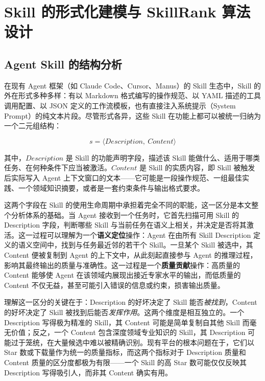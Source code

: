 
\chapter{Skill 的形式化建模与 SkillRank 算法设计}
\label{cha:modeling}

\section{Agent Skill 的结构分析}
\label{sec:skill_structure}

在现有 Agent 框架（如 Claude Code、Cursor、Manus）的 Skill 生态中，Skill 的外在形式多种多样：有以 Markdown 格式编写的操作规范、以 YAML 描述的工具调用配置、以 JSON 定义的工作流模板，也有直接注入系统提示（System Prompt）的纯文本片段。尽管形式各异，这些 Skill 在功能上都可以被统一归纳为一个二元组结构：

\begin{equation}
    \label{eq:skill_def}
    s = \langle \mathit{Description},\ \mathit{Content} \rangle
\end{equation}

其中，$\mathit{Description}$ 是 Skill 的功能声明字段，描述该 Skill 能做什么、适用于哪类任务、在何种条件下应当被激活。$\mathit{Content}$ 是 Skill 的实质内容，即 Skill 被触发后实际写入 Agent 上下文窗口的文本——它可能是一段操作规范、一组最佳实践、一个领域知识摘要，或者是一套约束条件与输出格式要求。

这两个字段在 Skill 的使用生命周期中承担着完全不同的职能，这一区分是本文整个分析体系的基础。当 Agent 接收到一个任务时，它首先扫描可用 Skill 的 Description 字段，判断哪些 Skill 与当前任务在语义上相关，并决定是否将其激活。这一过程可以理解为一个\textbf{语义定位}操作：Agent 在由所有 Skill Description 定义的语义空间中，找到与任务最近邻的若干个 Skill。一旦某个 Skill 被选中，其 Content 便被复制到 Agent 的上下文中，从此刻起直接参与 Agent 的推理过程，影响其最终输出的质量与准确性。这一过程是一个\textbf{质量贡献}操作：高质量的 Content 能够使 Agent 在该领域内展现出接近专家水平的输出，而低质量的 Content 不仅无益，甚至可能引入错误的信息或约束，损害输出质量。

理解这一区分的关键在于：Description 的好坏决定了 Skill 能否\textit{被找到}，Content 的好坏决定了 Skill 被找到后能否\textit{发挥作用}。这两个维度是相互独立的。一个 Description 写得极为精准的 Skill，其 Content 可能是简单复制自其他 Skill 而毫无价值；反之，一个 Content 包含深度领域专业知识的 Skill，其 Description 可能过于笼统，在大量候选中难以被精确识别。现有平台的根本问题在于，它们以 Star 数或下载量作为统一的质量指标，而这两个指标对于 Description 质量和 Content 质量的区分度都极为有限——一个 Skill 的高 Star 数可能仅仅反映其 Description 写得吸引人，而非其 Content 确实有用。

